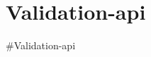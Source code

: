 \chapter{Validation-\/api}
\hypertarget{md_Readme}{}\label{md_Readme}
\label{md_Readme_autotoc_md0}%
%
\#\+Validation-\/api 